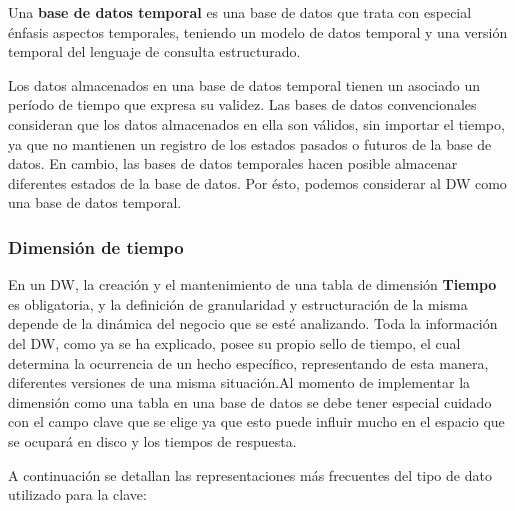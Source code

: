 \documentclass[a4paper,11pt]{article}
\begin{document}
    Una \textbf{base de datos temporal} es una base de datos que trata con especial énfasis aspectos temporales, teniendo un modelo de datos temporal y una versión
    temporal del lenguaje de consulta estructurado.
    
    Los datos almacenados en una base de datos temporal tienen un asociado un período de tiempo que expresa su validez. Las bases de datos convencionales
    consideran que los datos almacenados en ella son válidos, sin importar el tiempo, ya que no mantienen un registro de los estados pasados o futuros de
    la base de datos. En cambio, las bases de datos temporales hacen posible almacenar diferentes estados de la base de datos. Por ésto, podemos
    considerar al DW como una base de datos temporal.
    
    
    \subsubsection{Dimensión de tiempo}
    
    En un DW, la creación y el mantenimiento de una tabla de dimensión \textbf{Tiempo} es obligatoria, y la definición de granularidad y estructuración de la misma 
    depende de la dinámica del negocio que se esté analizando. Toda la información del DW, como ya se ha explicado, posee su propio sello de 
    tiempo, el cual determina la ocurrencia de un hecho específico, representando de esta manera, diferentes versiones de una misma situación.Al momento de 
    implementar la dimensión como una tabla en una base de datos se debe tener especial cuidado con el campo clave que se elige ya que esto puede influir 
    mucho en el espacio que se ocupará en disco y los tiempos de respuesta.\par
    
    A continuación se detallan las representaciones más frecuentes del tipo de dato utilizado para la clave:
    
\end{document}
